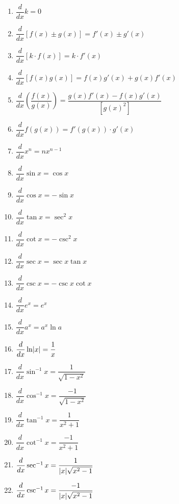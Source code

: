 \documentclass[12pt,a4paper]{article}
\DeclarePairedDelimiter\abs{\lvert}{\rvert}
\begin{document}

\begin{enumerate}
  \item $\dfrac{d}{dx}k = 0$
  \item $\dfrac{d}{dx}[f(x) \pm g(x)] = f'(x) \pm g'(x)$
  \item $\dfrac{d}{dx}[k \cdot f(x)] = k \cdot f'(x)$
  \item $\dfrac{d}{dx}[f(x)g(x)] = f(x)g'(x) + g(x)f'(x)$
  \item $\dfrac{d}{dx}\left( \dfrac{f(x)}{g(x)} \right) = \dfrac{g( x)f'(x) - f(x)g'(x)}{[g(x)^2]}$
  \item $\dfrac{d}{dx}f(g(x)) = f'(g(x)) \cdot g'(x)$
  \item $\dfrac{d}{dx}x^n = nx^{n-1}$
  \item $\dfrac{d}{dx}\sin x = \cos x$
  \item $\dfrac{d}{dx}\cos x = - \sin x$
  \item $\dfrac{d}{dx}\tan x = \sec^2 x$
  \item $\dfrac{d}{dx}\cot x = - \csc^2 x$
  \item $\dfrac{d}{dx}\sec x = \sec x \tan x$
  \item $\dfrac{d}{dx}\csc x = - \csc x \cot x$
  \item $\dfrac{d}{dx}e^x = e^x$
  \item $\dfrac{d}{dx}a^x = a^x \ln a$
  \item $\dfrac{d}{dx}\ln \abs{x}  = \dfrac{1}{x}$
  \item $\dfrac{d}{dx}\sin^{-1} x = \dfrac{1}{\sqrt{1 - x^2}}$
  \item $\dfrac{d}{dx}\cos^{-1} x = \dfrac{-1}{\sqrt{1 - x^2}}$
  \item $\dfrac{d}{dx}\tan^{-1} x = \dfrac{1}{x^2 + 1}$
  \item $\dfrac{d}{dx}\cot^{-1} x = \dfrac{-1}{x^2 + 1}$
  \item $\dfrac{d}{dx}\sec^{-1} x = \dfrac{1}{\abs{x} \sqrt{x^2 - 1}}$
  \item $\dfrac{d}{dx}\csc^{-1} x = \dfrac{-1}{\abs{x} \sqrt{x^2 - 1}}$
\end{enumerate}
\end{document}
